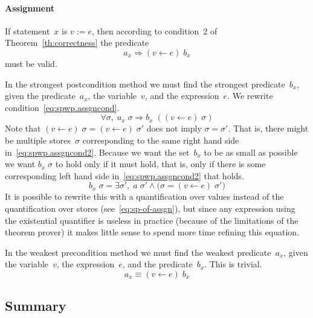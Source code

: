 \documentclass[a4paper]{article}
\newcommand{\limp}{\Rightarrow}
\theoremstyle{slanted}
\theoremstyle{definition}
\theoremstyle{remark}
\begin{document}
\paragraph{Assignment} If statement~$x$ is $v:=e$, then according to
condition~2 of Theorem~\ref{th:correctness} the predicate
\begin{equation}
a_x \limp (v \gets e)\;b_x
\label{eq:spwp.assgncond}
\end{equation}
must be valid.

In the strongest postcondition method we must find the strongest
predicate~$b_x$, given the predicate~$a_x$, the variable~$v$, and
the expression~$e$. We rewrite condition~\eqref{eq:spwp.assgncond}.
\begin{equation}
\forall\sigma,\; a_x\;\sigma \limp b_x\;((v\gets e)\;\sigma)
\label{eq:spwp.assgncond2}
\end{equation}
Note that $(v \gets e)\;\sigma=(v\gets e)\;\sigma'$
does not imply $\sigma=\sigma'$. That is, there might be multiple
stores~$\sigma$ corresponding to the same right hand side
in~\eqref{eq:spwp.assgncond2}. Because we want the set~$b_x$ to
be as small as possible we want $b_x\;\sigma$ to hold only if it
must hold, that is, only if there is some corresponding left hand
side in~\eqref{eq:spwp.assgncond2} that holds.
\begin{equation}
b_x\;\sigma = \exists\sigma',\;a\;\sigma' \land
  \bigl( \sigma=(v\gets e)\;\sigma' \bigr)
\end{equation}
It is possible to rewrite this with a quantification
over values instead of the quantification over stores
(see~\eqref{eq:sp-of-assgn}), but since any expression using the
existential quantifier is useless in practice (because of the
limitations of the theorem prover) it makes little sense to spend
more time refining this equation.

In the weakest precondition method we must find the weakest
predicate~$a_x$, given the variable~$v$, the expression~$e$,
and the predicate~$b_x$. This is trivial.
\begin{equation}
a_x \equiv (v\gets e)\;b_x
\end{equation}

\subsection{Summary}
\label{sec:spwp.summary}
\end{document}
